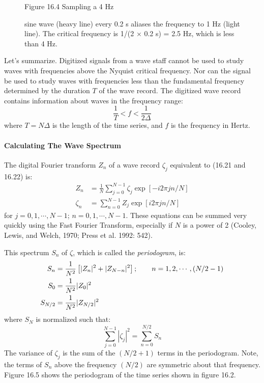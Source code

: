 \begin{figure}[t!]
\footnotesize
\centering
Figure 16.4 Sampling a 4 Hz \rule{0mm}{4ex}sine wave (heavy line)
every 0.2 s aliases the frequency to 1 Hz (light line). The critical
frequency is 1/(2 $\times$ 0.2 s) = 2.5 Hz, which is less than 4 Hz.

\label{fig:aliasplot}
\vspace{-3ex}
\end{figure}

Let's summarize. Digitized signals from a wave staff cannot be used to
study waves with frequencies above the Nyquist critical frequency. Nor
can the signal be used to study waves with frequencies less than the
fundamental frequency determined by the duration $T$ of the wave
record. The digitized wave record contains information about waves in
the frequency range:
\begin{equation}
\frac{1}{T} < f < \frac{1}{2 \Delta}
\end{equation}
where $T = N \Delta $ is the length of the time series, and $f$ is the
frequency in Hertz.

\paragraph{Calculating The Wave Spectrum}
The digital Fourier transform $Z_n$
of a wave record $\zeta _j$ equivalent to (16.21 and 16.22) is:
\begin{subequations}
\begin{align}
Z_{n} &= \frac{1}{N} \sum_{j=0}^{N-1} \zeta_{j} \exp [-i2 \pi j n /N] \\
\zeta_{n} &= \sum_{n=0}^{N-1} Z_{j} \exp [i 2 \pi j n /N]
\end{align}
\end{subequations}
for $j=0,1,\cdots, N-1$; $n= 0, 1, \cdots , N-1$. These equations can
be summed very quickly using the Fast Fourier Transform, especially if
$N$ is a power of 2 (Cooley, Lewis, and Welch, 1970; Press et
al. 1992: 542).

This spectrum $S_{n}$ of $\zeta $, which is called the
\textit{periodogram},
is:
\begin{align}
S_{n} &= \frac{1}{N^{2}} \left[ |Z_{n}|^{2} + |Z_{N-n}|^{2} \right] ; \qquad n =
1, 2, \cdots , ( N/2 - 1 ) \\
 S_{0} &= \frac{1}{N^{2}} |Z_{0}|^{2} \notag \\
S_{N/2} &= \frac{1}{N^{2}} |Z_{N/2}|^{2} \notag
\end{align}
where $ S_{N} $ is normalized such that:
\begin{equation}
\sum_{j=0}^{N-1} |\zeta_{j}|^2 = \sum_{n=0}^{N/2} S_{n}
\end{equation}
The variance of $\zeta_{j}$ is the sum of the $(N/2 + 1)$ terms in the
periodogram. Note, the terms of $S_{n}$ above the frequency $(N/2)$
are symmetric about that frequency. Figure 16.5 shows the periodogram
of the time series shown in figure 16.2.

